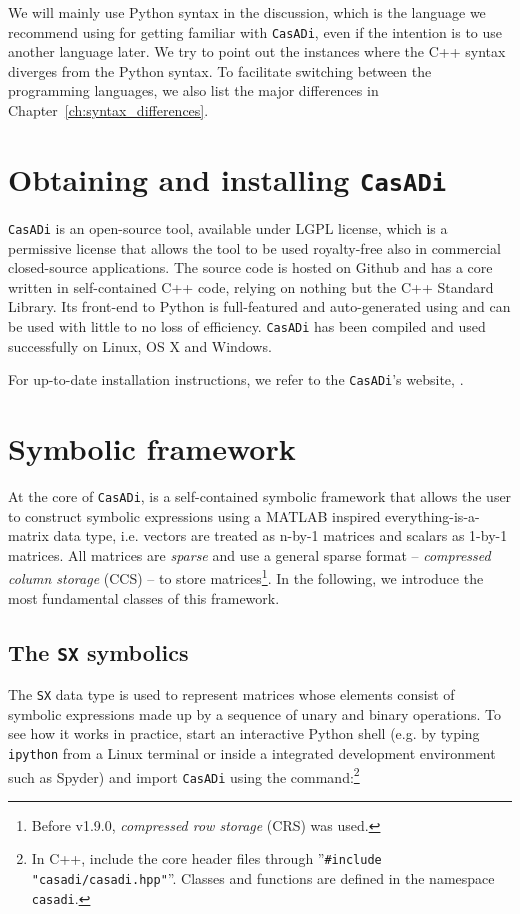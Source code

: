 \documentclass[a4paper,12pt]{book}
\newcommand{\CasADi}{\texttt{CasADi}\xspace}
\begin{document}
We will mainly use Python syntax in the discussion, which is the language we recommend using for getting familiar with \CasADi, even if the intention is to use another language later. We try to point out the instances where the C++ syntax diverges from the Python syntax. To facilitate switching between the programming languages, we also list the major differences in Chapter~\ref{ch:syntax_differences}.

\chapter{Obtaining and installing \CasADi}
\CasADi is an open-source tool, available under LGPL license, which is a permissive license that allows the tool to be used royalty-free also in commercial closed-source applications. The source code is hosted on Github and has a core written in self-contained C++ code, relying on nothing but the C++ Standard Library. Its front-end to Python is full-featured and auto-generated using  and can be used with little to no loss of efficiency. \CasADi has been compiled and used successfully on Linux, OS X and Windows.

For up-to-date installation instructions, we refer to the \CasADi's website, .

\chapter{Symbolic framework}
At the core of \CasADi, is a self-contained symbolic framework that allows the user to construct symbolic expressions using a MATLAB inspired everything-is-a-matrix data type, i.e. vectors are treated as n-by-1 matrices and scalars as 1-by-1 matrices. All matrices are \emph{sparse} and use a general sparse format -- \emph{compressed column storage} (CCS) -- to store matrices\footnote{Before v1.9.0, \emph{compressed row storage} (CRS) was used.}. In the following, we introduce the most fundamental classes of this framework.

\section{The \texttt{SX} symbolics}
The \texttt{SX} data type is used to represent matrices whose elements consist of symbolic expressions made up by a sequence of unary and binary operations. To see how it works in practice, start an interactive Python shell (e.g. by typing \texttt{ipython} from a Linux terminal or inside a integrated development environment such as Spyder) and import \CasADi using the command:\footnote{In C++, include the core header files through ''\texttt{\#include "casadi/casadi.hpp"}''. Classes and functions are defined in the namespace \texttt{casadi}.}
\end{document}
